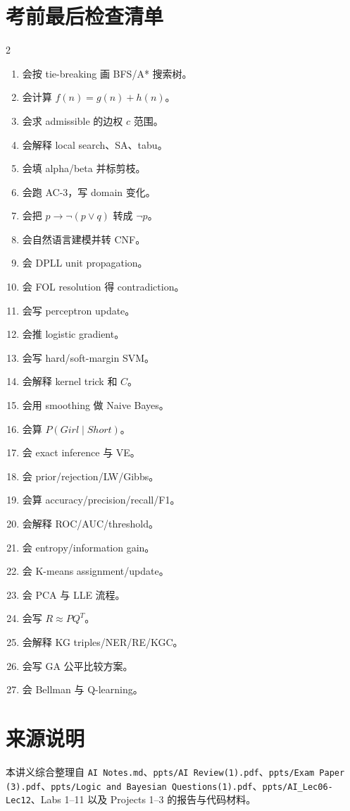 \documentclass[UTF8,11pt,a4paper]{ctexart}
\begin{document}
\section{考前最后检查清单}

\begin{multicols}{2}
\begin{enumerate}
\item 会按 tie-breaking 画 BFS/A* 搜索树。
\item 会计算 $f(n)=g(n)+h(n)$。
\item 会求 admissible 的边权 $c$ 范围。
\item 会解释 local search、SA、tabu。
\item 会填 alpha/beta 并标剪枝。
\item 会跑 AC-3，写 domain 变化。
\item 会把 $p\to\neg(p\lor q)$ 转成 $\neg p$。
\item 会自然语言建模并转 CNF。
\item 会 DPLL unit propagation。
\item 会 FOL resolution 得 contradiction。
\item 会写 perceptron update。
\item 会推 logistic gradient。
\item 会写 hard/soft-margin SVM。
\item 会解释 kernel trick 和 $C$。
\item 会用 smoothing 做 Naive Bayes。
\item 会算 $P(Girl\mid Short)$。
\item 会 exact inference 与 VE。
\item 会 prior/rejection/LW/Gibbs。
\item 会算 accuracy/precision/recall/F1。
\item 会解释 ROC/AUC/threshold。
\item 会 entropy/information gain。
\item 会 K-means assignment/update。
\item 会 PCA 与 LLE 流程。
\item 会写 $R\approx PQ^T$。
\item 会解释 KG triples/NER/RE/KGC。
\item 会写 GA 公平比较方案。
\item 会 Bellman 与 Q-learning。
\end{enumerate}
\end{multicols}

\section*{来源说明}

本讲义综合整理自 \texttt{AI Notes.md}、\texttt{ppts/AI Review(1).pdf}、\texttt{ppts/Exam Paper (3).pdf}、\texttt{ppts/Logic and Bayesian Questions(1).pdf}、\texttt{ppts/AI\_Lec06-Lec12}、Labs 1--11 以及 Projects 1--3 的报告与代码材料。
\end{document}

